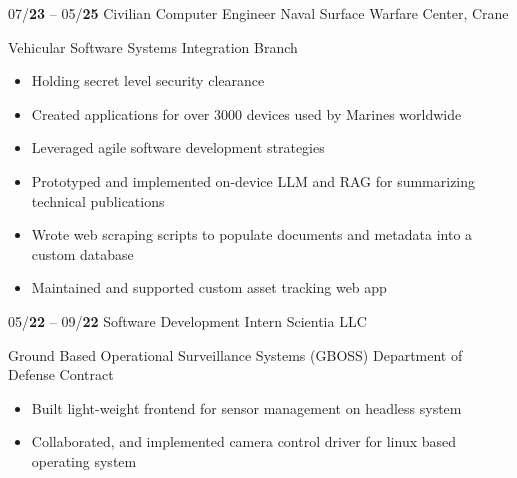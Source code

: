 \documentclass[9pt]{developercv} %
\begin{document}
\vspace{-\baselineskip}







\begin{entrylist}
	\entry
		{07/\textbf{23} -- 05/\textbf{25}}
		{Civilian Computer Engineer}
		{Naval Surface Warfare Center, Crane}
		{Vehicular Software Systems Integration Branch
		\begin{itemize}[noitemsep,topsep=0pt]
			\setlength\itemsep{0pt}
			\item[$\ast$] Holding secret level security clearance
			\item[$\ast$] Created applications for over 3000 devices used by Marines worldwide
			\item[$\ast$] Leveraged agile software development strategies
			\item[$\ast$] Prototyped and implemented on-device LLM and RAG for summarizing technical publications
			\item[$\ast$] Wrote web scraping scripts to populate documents and metadata into a custom database
			\item[$\ast$] Maintained and supported custom asset tracking web app
		\end{itemize}
	}
	\entry
		{05/\textbf{22} -- 09/\textbf{22}}
		{Software Development Intern}
		{Scientia LLC}
		{Ground Based Operational Surveillance Systems (GBOSS) Department of Defense Contract
			\begin{itemize}[noitemsep,topsep=0pt]
				\setlength\itemsep{0pt}
				\item[$\ast$] Built light-weight frontend for sensor management on headless system
				\item[$\ast$] Collaborated, and implemented camera control driver for linux based operating system
			\end{itemize}
		}
	\end{entrylist}
\end{document}

